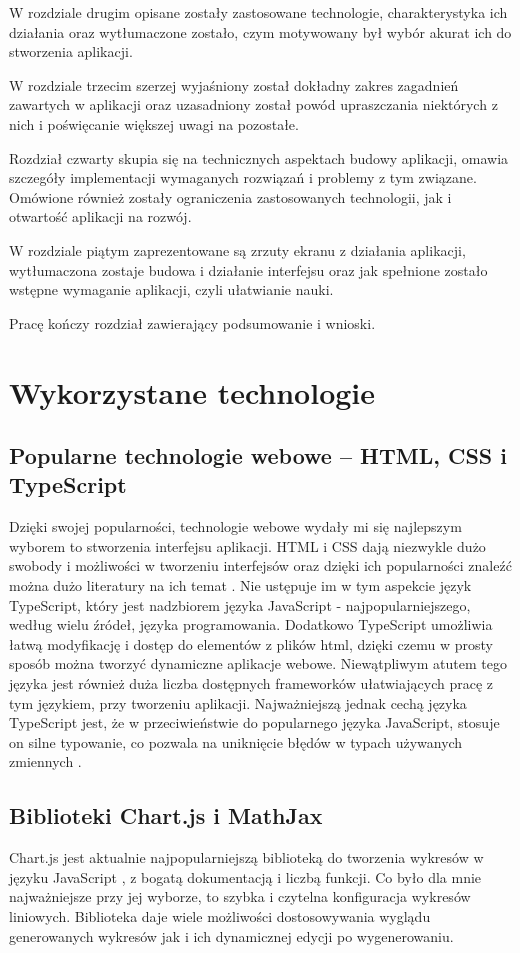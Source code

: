 \documentclass{SGGW-thesis}
\begin{document}
	W rozdziale drugim opisane zostały zastosowane technologie, charakterystyka ich działania oraz wytłumaczone zostało, czym motywowany był wybór akurat ich do stworzenia aplikacji.
	
	W rozdziale trzecim szerzej wyjaśniony został dokładny zakres zagadnień zawartych w aplikacji oraz uzasadniony został powód upraszczania niektórych z nich i poświęcanie większej uwagi na pozostałe.
	
	Rozdział czwarty skupia się na technicznych aspektach budowy aplikacji, omawia szczegóły implementacji wymaganych rozwiązań i problemy z tym związane. Omówione również zostały ograniczenia zastosowanych technologii, jak i otwartość aplikacji na rozwój.
	
	W rozdziale piątym zaprezentowane są zrzuty ekranu z działania aplikacji, wytłumaczona zostaje budowa i działanie interfejsu oraz jak spełnione zostało wstępne wymaganie aplikacji, czyli ułatwianie nauki.
	
	Pracę kończy rozdział zawierający podsumowanie i wnioski.
	
	
\chapter{Wykorzystane technologie}
	\section{Popularne technologie webowe -- HTML, CSS i TypeScript}
	Dzięki swojej popularności, technologie webowe wydały mi się najlepszym wyborem to stworzenia interfejsu aplikacji. HTML i CSS dają niezwykle dużo swobody i możliwości w tworzeniu interfejsów oraz dzięki ich popularności znaleźć można dużo literatury na ich temat \cite{mozilla-HTML} \cite{mozilla-CSS}. Nie ustępuje im w tym aspekcie język TypeScript, który jest nadzbiorem języka JavaScript - najpopularniejszego, według wielu źródeł, języka programowania. Dodatkowo TypeScript umożliwia łatwą modyfikację i dostęp do elementów z plików html, dzięki czemu w prosty sposób można tworzyć dynamiczne aplikacje webowe. Niewątpliwym atutem tego języka jest również duża liczba dostępnych frameworków \cite{React} \cite{Angular} \cite{Vue} \cite{Svelte} ułatwiających pracę z tym językiem, przy tworzeniu aplikacji. Najważniejszą jednak cechą języka TypeScript jest, że w przeciwieństwie do popularnego języka JavaScript, stosuje on silne typowanie, co pozwala na uniknięcie błędów w typach używanych zmiennych \cite{TS}.
	
	\section{Biblioteki Chart.js i MathJax}
	Chart.js jest aktualnie najpopularniejszą biblioteką do tworzenia wykresów w języku JavaScript \cite{chartjs}, z bogatą dokumentacją i liczbą funkcji. Co było dla mnie najważniejsze przy jej wyborze, to szybka i czytelna konfiguracja wykresów liniowych. Biblioteka daje wiele możliwości dostosowywania wyglądu generowanych wykresów jak i ich dynamicznej edycji po wygenerowaniu.
	
\end{document}
